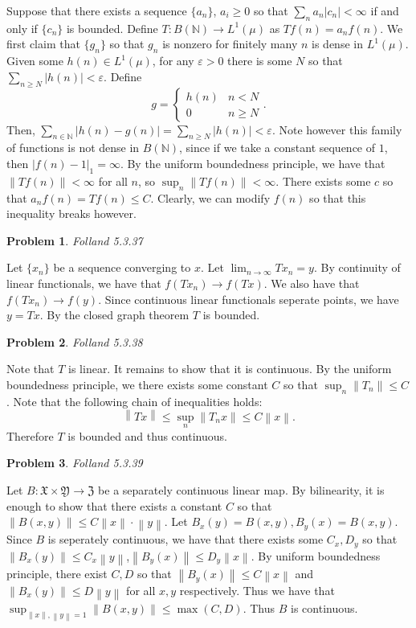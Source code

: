 \documentclass[12pt, a4paper]{article}
\newtheorem{problem}{Problem}
\theoremstyle{definition}
\newcommand{\N}{\mathbb{N}}                           %
\newcommand{\ep}{\varepsilon}
\newcommand{\norm}[1]{\left\lVert#1\right\rVert}
\begin{document}
Suppose that there exists a sequence $\{a_n\}$, $a_i\geq 0$ so that $\sum_{n}a_n |c_n|< \infty$ if and only if $\{c_n\}$ is bounded. Define $T: B\left(	\N\right) \to L^1(\mu)$ as $Tf(n) = a_nf(n)$. We first claim that $\{g_n\}$ so that $g_n$ is nonzero for finitely many $n$ is dense in $L^1(\mu)$. Given some $h(n)\in L^1(\mu)$, for any $\ep>0$ there is some $N$ so that $\sum_{n\geq N}|h(n)| <\ep$. Define $$g = \begin{cases} h(n) & n< N \\ 0 & n\geq N \end{cases}.$$  Then, $\sum_{n\in \N} |h(n) - g(n)| = \sum_{n\geq N} |h(n)| < \ep$. Note however this family of functions is not dense in $B(\N)$, since if we take a constant sequence of $1$, then $|f(n) - 1|_1 = \infty$. By the uniform boundedness principle, we have that $\norm{Tf(n)} < \infty$ for all $n$, so $\sup_{n}\norm{Tf(n)} < \infty$. There exists some $c$ so that $a_nf(n) =Tf(n) \leq C$. Clearly, we can modify $f(n)$ so that this inequality breaks however. 
\begin{problem}
	Folland 5.3.37
\end{problem}
Let $\{x_n\}$ be a sequence converging to $x$. Let $\lim_{n\to \infty } Tx_n = y$. By continuity of linear functionals, we have that $f(Tx_n) \to f(Tx)$. We also have that $f(Tx_n) \to f(y)$. Since continuous linear functionals seperate points, we have $y=Tx$. By the closed graph theorem $T$ is bounded. 
\begin{problem}
	Folland 5.3.38
\end{problem}
Note that $T$ is linear. It remains to show that it is continuous. By the uniform boundedness principle, we there exists some constant $C$ so that $\sup_{n}\norm{T_n} \leq C$. Note that the following chain of inequalities holds: 
$$\norm{Tx} \leq \sup_{n} \norm{T_nx} \leq C\norm{x}.$$
Therefore $T$ is bounded and thus continuous. 
\begin{problem}
	Folland 5.3.39
\end{problem}
Let $B: \mathfrak{X}\times \mathfrak{Y} \to \mathfrak{Z}$ be a separately continuous linear map. By bilinearity, it is enough to show that there exists a constant $C$ so that $\norm{B(x,y)} \leq C \norm{x} \cdot \norm{y}$. Let $B_x(y) = B(x,y), B_y(x) = B(x,y)$. Since $B$ is seperately continuous, we have that there exists some $C_x,D_y$ so that $ \norm{B_x(y) }\leq C_x \norm{y}$,$ \norm{B_y(x)} \leq D_y \norm{x}$.  By uniform boundedness principle, there exist $C,D$ so that $\norm{B_y(x)} \leq C \norm{x}$ and $\norm{B_x(y)} \leq D\norm{y}$ for all $x,y$ respectively. Thus we have that $\sup_{\norm{x}, \norm{y} = 1} \norm{B(x,y)}\leq \max{(C,D)}$. Thus $B$ is continuous.
\end{document}
